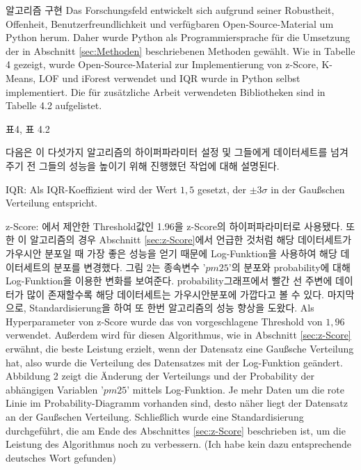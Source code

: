     알고리즘 구현
        Das Forschungsfeld entwickelt sich aufgrund seiner Robustheit, Offenheit, Benutzerfreundlichkeit und verfügbaren Open-Source-Material um Python herum. Daher wurde Python als Programmiersprache für die Umsetzung der in Abschnitt \ref{sec:Methoden} beschriebenen Methoden gewählt. Wie in Tabelle 4 gezeigt, wurde Open-Source-Material zur Implementierung von z-Score, K-Means, LOF und iForest verwendet und IQR wurde in Python selbst implementiert. Die für zusätzliche Arbeit verwendeten Bibliotheken sind in Tabelle 4.2 aufgelistet.
        
        표4, 표 4.2

        다음은 이 다섯가지 알고리즘의 하이퍼파라미터 설정 및 그들에게 데이터세트를 넘겨주기 전 그들의 성능을 높이기 위해 진행했던 작업에 대해 설명된다.

        IQR: Als IQR-Koeffizient wird der Wert $1,5$ gesetzt, der $\pm3\sigma$ in der Gaußschen Verteilung entspricht.

        z-Score: \cite{Killourhy09}에서 제안한 Threshold값인 1.96을 z-Score의 하이퍼파라미터로 사용됐다. 또한 이 알고리즘의 경우 Abschnitt \ref{sec:z-Score}에서 언급한 것처럼 해당 데이터세트가 가우시안 분포일 때 가장 좋은 성능을 얻기 때문에 Log-Funktion을 사용하여 해당 데이터세트의 분포를 변경했다. 그림 2는 종속변수 '$pm25$'의 분포와 probability에 대해 Log-Funktion을 이용한 변화를 보여준다. probability그래프에서 빨간 선 주변에 데이터가 많이 존재할수록 해당 데이터세트는 가우시안분포에 가깝다고 볼 수 있다. 마지막으로, Standardisierung을 하여 또 한번 알고리즘의 성능 향상을 도왔다.
        Als Hyperparameter von z-Score wurde das von \cite{Killourhy09} vorgeschlagene Threshold von $1,96$ verwendet. Außerdem wird für diesen Algorithmus, wie in Abschnitt \ref{sec:z-Score} erwähnt, die beste Leistung erzielt, wenn der Datensatz eine Gaußsche Verteilung hat, also wurde die Verteilung des Datensatzes mit der Log-Funktion geändert. Abbildung 2 zeigt die Änderung der Verteilungs und der Probability der abhängigen Variablen '$pm25$' mittels Log-Funktion. Je mehr Daten um die rote Linie im Probability-Diagramm vorhanden sind, desto näher liegt der Datensatz an der Gaußschen Verteilung. Schließlich wurde eine Standardisierung durchgeführt, die am Ende des Abschnittes \ref{sec:z-Score} beschrieben ist, um die Leistung des Algorithmus noch zu verbessern.
        (Ich habe kein dazu entsprechende deutsches Wort gefunden)

